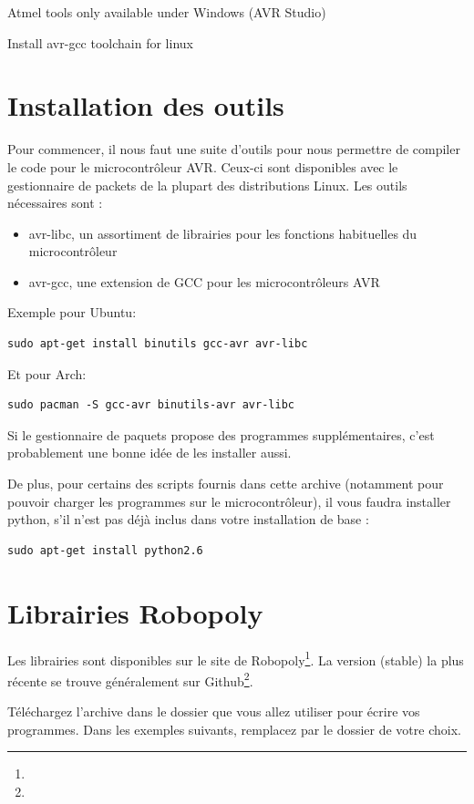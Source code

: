 Atmel tools only available under Windows (AVR Studio)

Install avr-gcc toolchain for linux

\section{Installation des outils}
Pour commencer, il nous faut une suite d'outils pour nous permettre de compiler
le code pour le microcontrôleur AVR. Ceux-ci sont disponibles avec le
gestionnaire de packets de la plupart des distributions Linux.
Les outils nécessaires sont :
\begin{itemize}
  \item avr-libc, un assortiment de librairies pour les fonctions habituelles du
    microcontrôleur
  \item avr-gcc, une extension de GCC pour les microcontrôleurs AVR
\end{itemize}

Exemple pour Ubuntu:
\begin{lstlisting}[style=console]
  sudo apt-get install binutils gcc-avr avr-libc
\end{lstlisting}
Et pour Arch:
\begin{lstlisting}[style=console]
  sudo pacman -S gcc-avr binutils-avr avr-libc
\end{lstlisting}
Si le gestionnaire de paquets propose des programmes supplémentaires, c'est
probablement une bonne idée de les installer aussi.

De plus, pour certains des scripts fournis dans cette archive (notamment pour
pouvoir charger les programmes sur le microcontrôleur), il vous faudra installer
python, s'il n'est pas déjà inclus dans votre installation de base :

\begin{lstlisting}[style=console]
  sudo apt-get install python2.6
\end{lstlisting}

\section{Librairies Robopoly}
Les librairies sont disponibles sur le site de
Robopoly\footnote{\urlrobopoly{}}. La version
(stable) la plus récente se trouve généralement sur
Github\footnote{\urldownloads{}}.

Téléchargez l'archive dans le dossier que vous allez utiliser pour écrire vos
programmes. Dans les exemples suivants, remplacez  par le
dossier de votre choix.

